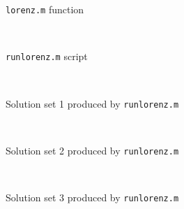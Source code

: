 \documentclass[11pt]{article}
\begin{document}
\begin{enumerate}
		\begin{center}
			\texttt{lorenz.m} function
		\end{center}
		 \

		\begin{center}
			\texttt{runlorenz.m} script
		\end{center}
		 \

		\begin{center}
			Solution set 1 produced by \texttt{runlorenz.m}
		\end{center}
		 \

		\begin{center}
			Solution set 2 produced by \texttt{runlorenz.m}
		\end{center}
		 \

		\begin{center}
			Solution set 3 produced by \texttt{runlorenz.m}
		\end{center}
		 \

\end{enumerate}
\end{document}
